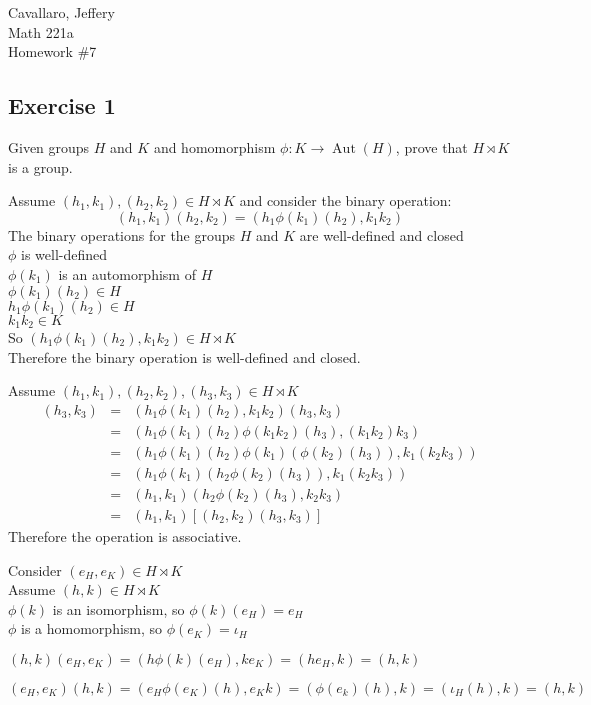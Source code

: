 \documentclass[letterpaper,12pt,fleqn]{article}
\DeclareMathOperator{\Aut}{Aut}
\newcommand{\p}{\phi}
\renewcommand{\i}{\iota}
\begin{document}
Cavallaro, Jeffery \\
Math 221a \\
Homework \#7

\bigskip

\subsection*{Exercise 1}

Given groups $H$ and $K$ and homomorphism $\p:K\to\Aut(H)$, prove that
$H\rtimes K$ is a group.

Assume $(h_1,k_1),(h_2,k_2)\in H\rtimes K$ and consider the binary operation:
\[(h_1,k_1)(h_2,k_2)=(h_1\p(k_1)(h_2),k_1k_2)\]
The binary operations for the groups $H$ and $K$ are well-defined and closed \\
$\p$ is well-defined \\
$\p(k_1)$ is an automorphism of $H$ \\
$\p(k_1)(h_2)\in H$ \\
$h_1\p(k_1)(h_2)\in H$ \\
$k_1k_2\in K$ \\
So $(h_1\p(k_1)(h_2),k_1k_2)\in H\rtimes K$ \\
Therefore the binary operation is well-defined and closed.

Assume $(h_1,k_1),(h_2,k_2),(h_3,k_3)\in H\rtimes K$
\begin{eqnarray*}
  [(h_1,k_1)(h_2,k_2)](h_3,k_3) &=& (h_1\p(k_1)(h_2),k_1k_2)(h_3,k_3) \\
  &=& (h_1\p(k_1)(h_2)\p(k_1k_2)(h_3),(k_1k_2)k_3) \\
  &=& (h_1\p(k_1)(h_2)\p(k_1)(\p(k_2)(h_3)),k_1(k_2k_3)) \\
  &=& (h_1\p(k_1)(h_2\p(k_2)(h_3)),k_1(k_2k_3)) \\
  &=& (h_1,k_1)(h_2\p(k_2)(h_3),k_2k_3) \\
  &=& (h_1,k_1)[(h_2,k_2)(h_3,k_3)]
\end{eqnarray*}
Therefore the operation is associative.

Consider $(e_H,e_K)\in H\rtimes K$ \\
Assume $(h,k)\in H\rtimes K$ \\
$\p(k)$ is an isomorphism, so $\p(k)(e_H)=e_H$ \\
$\p$ is a homomorphism, so $\p(e_K)=\i_H$

$(h,k)(e_H,e_K)=(h\p(k)(e_H),ke_K)=(he_H,k)=(h,k)$

$(e_H,e_K)(h,k)=(e_H\p(e_K)(h),e_Kk)=(\p(e_k)(h),k)=(\i_H(h),k)=(h,k)$
\end{document}
